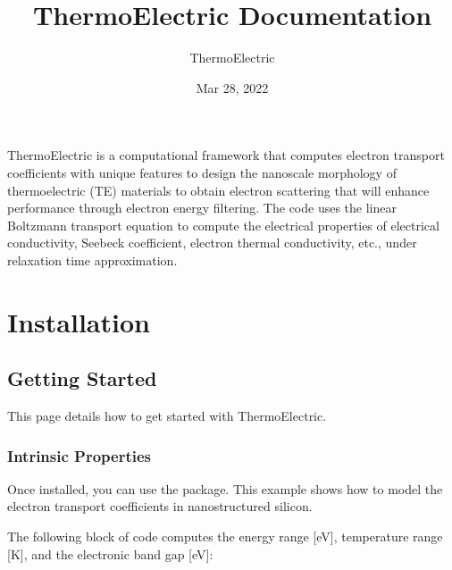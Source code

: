 \documentclass[letterpaper,10pt,english]{sphinxmanual}
\title{ThermoElectric Documentation}
\date{Mar 28, 2022}
\author{ThermoElectric}
\begin{document}
\pagestyle{empty}
\sphinxmaketitle
\pagestyle{plain}
\sphinxtableofcontents
\pagestyle{normal}
\label{\detokenize{index::doc}}


\sphinxAtStartPar
ThermoElectric is a computational framework that computes electron transport coefficients with unique features to design
the nanoscale morphology of thermoelectric (TE) materials to obtain electron scattering that will enhance performance
through electron energy filtering. The code uses the linear Boltzmann transport equation to compute the electrical
properties of electrical conductivity, Seebeck coefficient, electron thermal conductivity, etc., under relaxation time
approximation.


\chapter{Installation}
\label{\detokenize{index:installation}}
\begin{sphinxVerbatim}[commandchars=\\\{\}]
   
 
   
\end{sphinxVerbatim}


\section{Getting Started}
\label{\detokenize{getting_started:getting-started}}\label{\detokenize{getting_started::doc}}
\sphinxAtStartPar
This page details how to get started with ThermoElectric.


\subsection{Intrinsic Properties}
\label{\detokenize{getting_started:intrinsic-properties}}
\sphinxAtStartPar
Once installed, you can use the package. This example shows how to model the electron transport coefficients in
nano\sphinxhyphen{}structured silicon.

\sphinxAtStartPar
The following block of code computes the energy range {[}eV{]}, temperature range {[}K{]}, and the electronic band gap {[}eV{]}:
\end{document}
